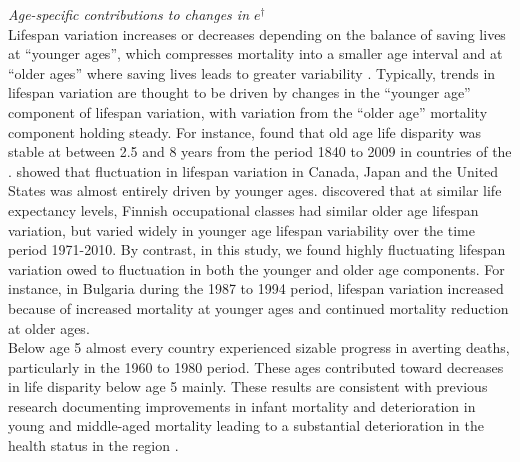 \documentclass{article}
\begin{document}
\begin{spacing}{1.5}
\emph{Age-specific contributions to changes in $e^\dagger$}\\

Lifespan variation increases or decreases depending on the balance of saving lives at ``younger ages'', which compresses mortality into a smaller age interval and at ``older ages'' where saving lives leads to greater variability \citep{zhang2009, gillespie2014divergence,vanraalte2013}. Typically, trends in lifespan variation are thought to be driven by changes in the ``younger age'' component of lifespan variation, with variation from the ``older age'' mortality component holding steady. For instance, \citet{vaupel2011} found that old age life disparity was stable at between 2.5 and 8 years from the period 1840 to 2009 in countries of the \cite{HMD}. \citet{gillespie2014divergence} showed that fluctuation in lifespan variation in Canada, Japan and the United States was almost entirely driven by younger ages. \citet{vanraalte2014} discovered that at similar life expectancy levels, Finnish occupational classes had similar older age lifespan variation, but varied widely in younger age lifespan variability over the time period 1971-2010.  By contrast, in this study, we found highly fluctuating lifespan variation owed to fluctuation in both the younger and older age components. For instance, in Bulgaria during the 1987 to 1994 period, lifespan variation increased because of increased mortality at younger ages and continued mortality reduction at older ages. \\

Below age 5 almost every country experienced sizable progress in averting deaths, particularly in the 1960 to 1980 period. These ages contributed toward decreases in life disparity below age 5 mainly. These results are consistent with previous research documenting improvements in infant mortality and deterioration in young and middle-aged mortality leading to a substantial deterioration in the health status in the region \citep{chenet1996}. \\


\end{spacing}
\end{document}
